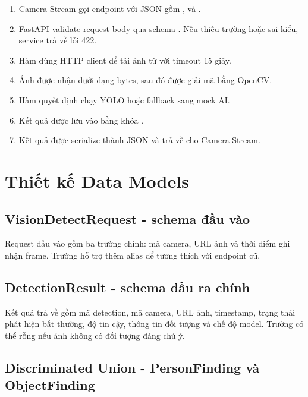 \begin{enumerate}
    \item Camera Stream gọi endpoint  với JSON gồm ,  và .
    \item FastAPI validate request body qua schema . Nếu thiếu trường hoặc sai kiểu, service trả về lỗi 422.
    \item Hàm  dùng HTTP client để tải ảnh từ  với timeout 15 giây.
    \item Ảnh được nhận dưới dạng bytes, sau đó được giải mã bằng OpenCV.
    \item Hàm  quyết định chạy YOLO hoặc fallback sang mock AI.
    \item Kết quả  được lưu vào  bằng khóa .
    \item Kết quả được serialize thành JSON và trả về cho Camera Stream.
\end{enumerate}

\section{Thiết kế Data Models}

\subsection{VisionDetectRequest - schema đầu vào}

Request đầu vào gồm ba trường chính: mã camera, URL ảnh và thời điểm ghi nhận frame. Trường  hỗ trợ thêm alias  để tương thích với endpoint cũ.

\subsection{DetectionResult - schema đầu ra chính}

Kết quả trả về gồm mã detection, mã camera, URL ảnh, timestamp, trạng thái phát hiện bất thường, độ tin cậy, thông tin đối tượng và chế độ model. Trường  có thể rỗng nếu ảnh không có đối tượng đáng chú ý.

\subsection{Discriminated Union - PersonFinding và ObjectFinding}

